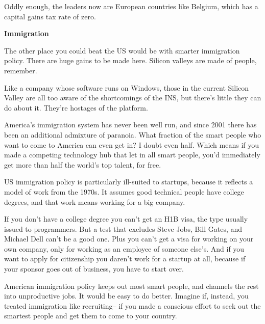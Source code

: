 Oddly enough, the
                  leaders now are European countries like Belgium, which has a
                  capital gains tax rate of zero.

\textbf{Immigration}

The other place you could beat the US would be
                  with smarter immigration policy. There are huge gains to be
                  made here. Silicon valleys are made of people, remember.

Like
                  a company whose software runs on Windows, those in the current
                  Silicon Valley are all too aware of the shortcomings of the
                  INS, but there's little they can do about it. They're hostages
                  of the platform.

America's immigration system has
                  never been well run, and since 2001 there has been an
                  additional admixture of paranoia. What fraction of the smart
                  people who want to come to America can even get in? I doubt
                  even half. Which means if you made a competing technology hub
                  that let in all smart people, you'd immediately get more than
                  half the world's top talent, for free.

US
                  immigration policy is particularly ill-suited to startups,
                  because it reflects a model of work from the 1970s. It assumes
                  good technical people have college degrees, and that work
                  means working for a big company.

If you don't have
                  a college degree you can't get an H1B visa, the type usually
                  issued to programmers. But a test that excludes Steve Jobs,
                  Bill Gates, and Michael Dell can't be a good one. Plus you
                  can't get a visa for working on your own company, only for
                  working as an employee of someone else's. And if you want to
                  apply for citizenship you daren't work for a startup at all,
                  because if your sponsor goes out of business, you have to
                  start over.

American immigration policy keeps out
                  most smart people, and channels the rest into unproductive
                  jobs. It would be easy to do better. Imagine if, instead, you
                  treated immigration like recruiting-- if you made a conscious
                  effort to seek out the smartest people and get them to come to
                  your country.

